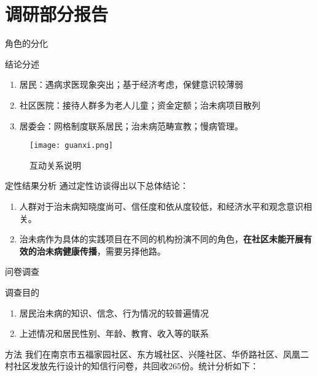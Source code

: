 \section{调研部分报告}

\begin{frame}{角色的分化}
\begin{alertblock}{结论分述}
\begin{enumerate}
\item 居民：遇病求医现象突出；基于经济考虑，保健意识较薄弱

\item 社区医院：接待人群多为老人儿童；资金定额；治未病项目散列

\item 居委会：网格制度联系居民；治未病范畴宣教；慢病管理。
\end{enumerate}
\end{alertblock}
\begin{figure}[h]
    \texttt{[image: guanxi.png]}
    \centering
    \caption{互动关系说明}
\end{figure}
\end{frame}

\begin{frame}{定性结果分析}
通过定性访谈得出以下总体结论：
\begin{enumerate}
    \item 人群对于治未病知晓度尚可、信任度和依从度较低，和经济水平和观念意识相关。
    \item 治未病作为具体的实践项目在不同的机构扮演不同的角色，\textbf{在社区未能开展有效的治未病健康传播}，需要另择他路。
\end{enumerate}
\end{frame}

\begin{frame}{问卷调查}
\begin{exampleblock}{调查目的}

\begin{enumerate}
    \item 居民治未病的知识、信念、行为情况的较普遍情况
    \item 上述情况和居民性别、年龄、教育、收入等的联系
\end{enumerate}\end{exampleblock}
\begin{alertblock}{方法}
    我们在南京市五福家园社区、东方城社区、兴隆社区、华侨路社区、凤凰二村社区发放先行设计的知信行问卷，共回收265份。统计分析如下：
\end{alertblock}
\end{frame}

